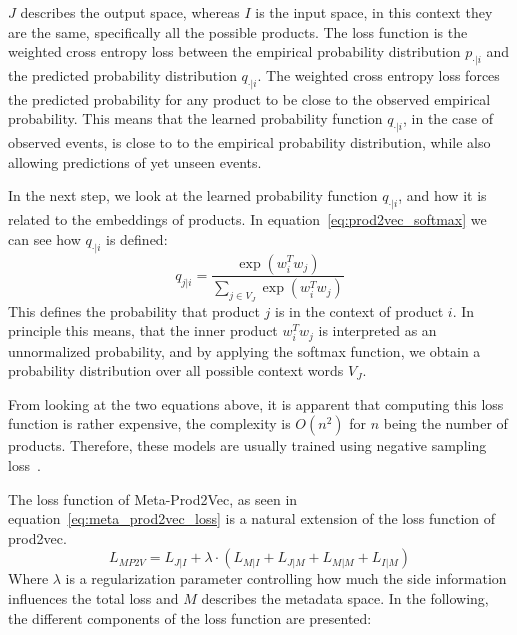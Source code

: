 $J$ describes the output space, whereas $I$ is the input space, in this context they are the same, specifically all the possible products.
The loss function is the weighted cross entropy loss between the empirical probability distribution $p_{\cdot|i}$ and the predicted probability distribution $q_{\cdot|i}$.
The weighted cross entropy loss forces the predicted probability for any product to be close to the observed empirical probability.
This means that the learned probability function $q_{\cdot|i}$, in the case of observed events, is close to to the empirical probability distribution, while also allowing predictions of yet unseen events.
\par
In the next step, we look at the learned probability function $q_{\cdot|i}$, and how it is related to the embeddings of products.
In equation~\ref{eq:prod2vec_softmax} we can see how $q_{\cdot|i}$ is defined:
\begin{equation}\label{eq:prod2vec_softmax}
    q_{j|i} = \frac{\exp(w_i^Tw_j)}{\sum_{j \in V_J} \exp(w_i^Tw_{j})}
\end{equation}
This defines the probability that product $j$ is in the context of product $i$.
In principle this means, that the inner product $w_i^Tw_j$ is interpreted as an unnormalized probability, and by applying the softmax function, we obtain a probability distribution over all possible context words $V_J$.
\par
From looking at the two equations above, it is apparent that computing this loss function is rather expensive, the complexity is $O(n^2)$ for $n$ being the number of products.
Therefore, these models are usually trained using negative sampling loss~\cite{neg_sampling}.
\par
The loss function of Meta-Prod2Vec, as seen in equation~\ref{eq:meta_prod2vec_loss} is a natural extension of the loss function of prod2vec.
\begin{equation}\label{eq:meta_prod2vec_loss}
    L_{MP2V} = L_{J|I} + \lambda \cdot (L_{M|I} + L_{J|M} + L_{M|M} + L_{I|M})
\end{equation}
Where $\lambda$ is a regularization parameter controlling how much the side information influences the total loss and $M$ describes the metadata space.
In the following, the different components of the loss function are presented:
